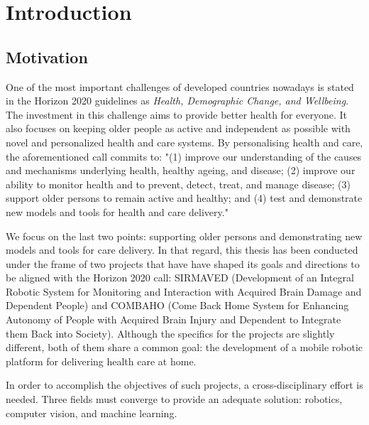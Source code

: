 \chapter{Introduction}
\label{cha:introduction}

\begin{chapterabstract}
\end{chapterabstract}

\minitoc

\clearpage

\section{Motivation}
\label{cha:introduction:sec:motivation}

One of the most important challenges of developed countries nowadays is stated in the Horizon 2020 guidelines as \emph{Health, Demographic Change, and Wellbeing}. The investment in this challenge aims to provide better health for everyone. It also focuses on keeping older people as active and independent as possible with novel and personalized health and care systems. By personalising health and care, the aforementioned call commits to: "(1) improve our understanding of the causes and mechanisms underlying health, healthy ageing, and disease; (2) improve our ability to monitor health and to prevent, detect, treat, and manage disease; (3) support older persons to remain active and healthy; and (4) test and demonstrate new models and tools for health and care delivery."

We focus on the last two points: supporting older persons and demonstrating new models and tools for care delivery. In that regard, this thesis has been conducted under the frame of two projects that have have shaped its goals and directions to be aligned with the Horizon 2020 call: SIRMAVED (Development of an Integral Robotic System for Monitoring and Interaction with Acquired Brain Damage and Dependent People) and COMBAHO (Come Back Home System for Enhancing Autonomy of People with Acquired Brain Injury and Dependent to Integrate them Back into Society). Although the specifics for the projects are slightly different, both of them share a common goal: the development of a mobile robotic platform for delivering health care at home.

In order to accomplish the objectives of such projects, a cross-disciplinary effort is needed. Three fields must converge to provide an adequate solution: robotics, computer vision, and machine learning.

